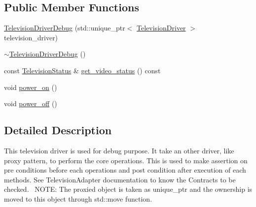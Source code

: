 \subsection*{Public Member Functions}
\begin{DoxyCompactItemize}
\item 
\hyperlink{classTelevisionDriverDebug_a6519c487afc26a2fdb9869a9733705fa}{Television\+Driver\+Debug} (std\+::unique\+\_\+ptr$<$ \hyperlink{classTelevisionDriver}{Television\+Driver} $>$ television\+\_\+driver)
\item 
\hyperlink{classTelevisionDriverDebug_afd370254cfa8eae311fb85752a385c72}{$\sim$\+Television\+Driver\+Debug} ()
\item 
const \hyperlink{structTelevisionStatus}{Television\+Status} \& \hyperlink{classTelevisionDriverDebug_ad23820f9639351e2b222fdb941ee2792}{get\+\_\+video\+\_\+status} () const 
\item 
void \hyperlink{classTelevisionDriverDebug_a1f5e16575b48f979a44d81fba14a836e}{power\+\_\+on} ()
\item 
void \hyperlink{classTelevisionDriverDebug_aae9ffd499fa9b050e4eadb846b0b7257}{power\+\_\+off} ()
\end{DoxyCompactItemize}


\subsection{Detailed Description}
This television driver is used for debug purpose. It take an other driver, like proxy pattern, to perform the core operations. This is used to make assertion on pre conditions before each operations and post condition after execution of each methods. See Television\+Adapter documentation to know the Contracts to be checked.~\newline
 N\+O\+T\+E\+: The proxied object is taken as unique\+\_\+ptr and the ownership is moved to this object through std\+::move function. 

